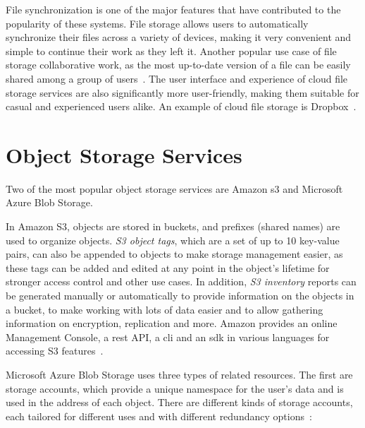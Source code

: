 File synchronization is one of the major features that have contributed to the popularity of these systems. File storage allows users to automatically synchronize their files across a variety of devices, making it very convenient and simple to continue their work as they left it. Another popular use case of file storage collaborative work, as the most up-to-date version of a file can be easily shared among a group of users~\cite{personal1}. The user interface and experience of cloud file storage services are also significantly more user-friendly, making them suitable for casual and experienced users alike. An example of cloud file storage is Dropbox~\cite{dropbox}.


\section{Object Storage Services}
Two of the most popular object storage services are Amazon \ac{s3} and Microsoft Azure Blob Storage.

In Amazon S3, objects are stored in buckets, and prefixes (shared names) are used to organize objects. \textit{S3 object tags}, which are a set of up to 10 key-value pairs, can also be appended to objects to make storage management easier, as these tags can be added and edited at any point in the object's lifetime for stronger access control and other use cases. In addition, \textit{S3 inventory} reports can be generated manually or automatically to provide information on the objects in a bucket, to make working with lots of data easier and to allow gathering information on encryption, replication and more. Amazon provides an online Management Console, a \ac{rest} API, a \ac{cli} and an \ac{sdk} in various languages for accessing S3 features~\cite{s3faq}.

Microsoft Azure Blob Storage uses three types of related resources. The first are storage accounts, which provide a unique namespace for the user's data and is used in the address of each object. There are different kinds of storage accounts, each tailored for different uses and with different redundancy options~\cite{blobaccounts}:

